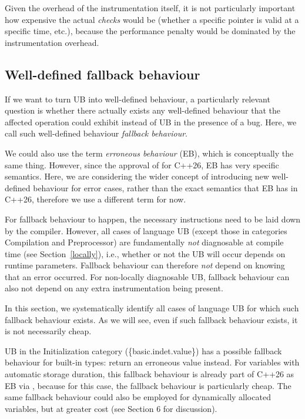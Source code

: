 Given the overhead of the instrumentation itself, it is not particularly important how expensive the actual \emph{checks} would be (whether a specific pointer is valid at a specific time, etc.), because the performance penalty would be dominated by the instrumentation overhead. 

\subsection{Well-defined fallback behaviour}
\label{fallback}

If we want to turn UB into well-defined behaviour, a particularly relevant question is whether there actually exists any well-defined behaviour that the affected operation could exhibit instead of UB in the presence of a bug. Here, we call such well-defined behaviour \emph{fallback behaviour}.

We could also use the term \emph{erroneous behaviour} (EB), which is conceptually the same thing. However, since the approval of \cite{P2795R5} for C++26, EB has very specific semantics. Here, we are considering the wider concept of introducing new well-defined behaviour for error cases, rather than the exact semantics that EB has in C++26, therefore we use a different term for now.

For fallback behaviour to happen, the necessary instructions need to be laid down by the compiler. However, all cases of language UB (except those in categories Compilation and Preprocessor) are fundamentally \emph{not} diagnosable at compile time (see Section~\ref{locally}), i.e., whether or not the UB will occur depends on runtime parameters. Fallback behaviour can therefore \emph{not} depend on knowing that an error occurred. For non-locally diagnosable UB, fallback behaviour can also not depend on any extra instrumentation being present.

In this section, we systematically identify all cases of language UB for which such fallback behaviour exists. As we will see, even if such fallback behaviour exists, it is not necessarily cheap.

UB in the Initialization category (\{basic.indet.value\}) has a possible fallback behaviour for built-in types: return an erroneous value instead. For variables with automatic storage duration, this fallback behaviour is already part of C++26 as EB via \cite{P2795R5}, because for this case, the fallback behaviour is particularly cheap. The same fallback behaviour could also be employed for dynamically allocated variables, but at greater cost (see \cite{P2723R1} Section 6 for discussion). 

